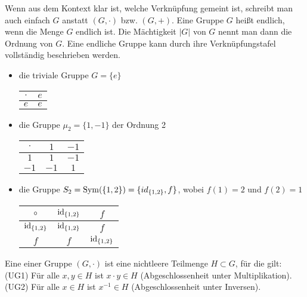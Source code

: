 \begin{remark}
	Wenn aus dem Kontext klar ist, welche Verknüpfung gemeint ist, schreibt man auch einfach
	$G$ anstatt $(G, \cdot)$ bzw. $(G,+)$. Eine Gruppe $G$ heißt endlich, wenn die Menge $G$ endlich
	ist. Die Mächtigkeit $|G|$ von $G$ nennt man dann die Ordnung von $G$. Eine endliche Gruppe kann 
	durch ihre Verknüpfungstafel vollständig beschrieben werden.
\end{remark}

\begin{example}
	\begin{itemize}
		\item die triviale Gruppe $G=\{e\}$
		\begin{center}
			\begin{tabular}{|c|c|}
				\hline
				$\cdot$ & $e$\\
				\hline
				$e$ & $e$ \\
				\hline
			\end{tabular}
		\end{center}
		\item die Gruppe $\mu_2 = \{1,-1\}$ der Ordnung 2
		\begin{center}
			\begin{tabular}{|c|c|c|}
				\hline
				$\cdot$ & $1$ & $-1$\\
				\hline
				$1$ & $1$ & $-1$ \\
				\hline
				$-1$ & $-1$ & $1$ \\
				\hline
			\end{tabular}
		\end{center}
		\item die Gruppe $S_2= \operatorname{Sym}(\{1,2\}) = \{id_{\{1,2\}},f\}$, wobei $f(1)=2$ und $f(2)=1$
		\begin{center}
			\begin{tabular}{|c|c|c|}
				\hline
				$\circ$ & $\operatorname{id}_{\{1,2\}}$ & $f$\\
				\hline
				$\operatorname{id}_{\{1,2\}}$ & $\operatorname{id}_{\{1,2\}}$ & $f$ \\
				\hline
				$f$ & $f$ & $\operatorname{id}_{\{1,2\}}$ \\
				\hline
			\end{tabular}
		\end{center}
	\end{itemize}
\end{example}

\begin{definition}[Untergruppe]
	Eine  einer Gruppe $(G,\cdot)$ ist eine 
	nichtleere Teilmenge $H \subset G$, für die gilt: \\
	(UG1) Für alle $x,y \in H$ ist $x \cdot y \in H$ (Abgeschlossenheit unter Multiplikation). \\
	(UG2) Für alle $x \in H$ ist $x^{-1} \in H$ (Abgeschlossenheit unter Inversen).
\end{definition}

